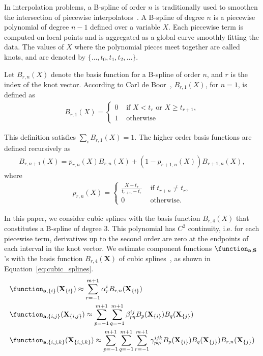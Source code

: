 In interpolation problems, a B-spline of order $ n $ is traditionally used to smoothen the intersection of piecewise interpolators~\cite{schumaker2007spline}. A B-spline of degree $n$ is a piecewise polynomial of degree $ n - 1 $ defined over a variable $ X $. Each piecewise term is computed on local points and is aggregated as a global curve smoothly fitting the data. The values of $ X $ where the polynomial pieces meet together are called knots, and are denoted by $\{ \dots, t_0, t_1, t_2, \dots\} $. 

Let $ B_{r, n}(X) $ denote the basis function for a B-spline of order $ n $, and $ r $ is the index of the knot vector. According to Carl de Boor~\cite{de1971subroutine}, $ B_{r,1}(X) $, for $ n = 1 $, is defined as
\begin{align*}
B_{r,1}(X) = 
\begin{cases}
0 &\text{ if } X < t_r \text{ or } X \ge t_{r+1},\\
1 &\text{ otherwise}
\end{cases}
\end{align*}

This definition satisfies $ \sum_i B_{r, 1}(X) = 1 $. The higher order basis functions are defined recursively as
\begin{align*}
	B_{r, n + 1}(X) = p_{r, n}(X)B_{r, n}(X) + (1 - p_{r + 1, n}(X))B_{r + 1, n}(X),
\end{align*}
where 
\begin{align*}
p_{r,n}(X) = 
\begin{cases}
\frac{X - t_r}{t_{r + n} - t_r} &\text{ if } t_{r + n} \ne t_r,\\
0 &\text{ otherwise.}
\end{cases}
\end{align*}


In this paper, we consider cubic splines with the basis function $ B_{r,4}(X) $ that constitutes a B-spline of degree $ 3 $. This polynomial has $ C^2 $ continuity, i.e. for each piecewise term, derivatives up to the second order are zero at the endpoints of each interval in the knot vector. We estimate component functions $ \function_{\mathbf{a}, \mathbf{S}} $'s with the basis function $ B_{r,4}(\mathbf{X})  $ of cubic splines~\cite{li2010global}, as shown in Equation~\eqref{eq:cubic_splines}.  
\begin{align}\label{eq:cubic_splines}
\begin{split}
&\function_{\mathbf{a}, \{i\}} (\mathbf{X}_{\{i\}}) \approx \sum_{r=-1}^{m+1}\alpha_r^iB_{r,n}(\mathbf{X}_{\{i\}})\\
&\function_{\mathbf{a}, \{i, j\}} (\mathbf{X}_{\{i, j\}}) \approx \sum_{p=-1}^{m+1}\sum_{q=-1}^{m+1}\beta_{pq}^{ij}B_p(\mathbf{X}_{\{i\}})B_q(\mathbf{X}_{\{j\}})\\
&\function_{\mathbf{a}, \{i, j, k\}} (\mathbf{X}_{\{i, j, k\}}) \approx \sum_{p=-1}^{m+1}\sum_{q=-1}^{m+1}\sum_{r=-1}^{m+1}\gamma_{pqr}^{ijk}B_p(\mathbf{X}_{\{i\}})B_q(\mathbf{X}_{\{j\}})B_{r,n}(\mathbf{X}_{\{j\}})
\end{split}
\end{align}

